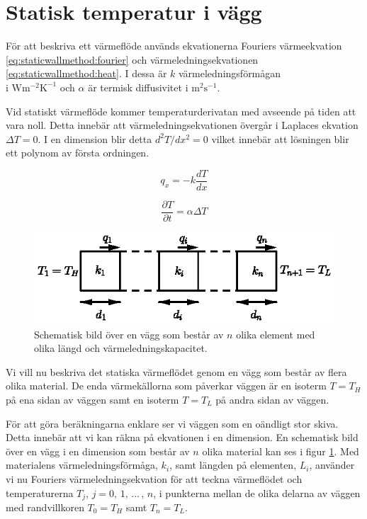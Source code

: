 \section{Statisk temperatur i vägg}

För att beskriva ett värmeflöde används ekvationerna Fouriers värmeekvation
\eqref{eq:staticwallmethod:fourier} och värmeledningsekvationen 
\eqref{eq:staticwallmethod:heat}. 
I dessa är
$k$ värmeledningsförmågan\\i $\mbox{W}\mbox{m}^{-2}\mbox{K}^{-1}$ och
$\alpha$ är termisk diffusivitet i $\mbox{m}^2\mbox{s}^{-1}$. \cite{physicshandbook}

Vid statiskt värmeflöde kommer temperaturderivatan med avseende på tiden att vara noll.
Detta innebär att värmeledningsekvationen övergår i Laplaces ekvation
$\Delta{}T = 0$. I en dimension blir detta $d^2T/dx^2 = 0$ vilket innebär
att lösningen blir ett polynom av första ordningen.  

\begin{equation}
\label{eq:staticwallmethod:fourier}
q_x = -k\frac{dT}{dx}
\end{equation}

\begin{equation}
\label{eq:staticwallmethod:heat}
\frac{\partial{}T}{\partial{}t} = \alpha\Delta{}T
\end{equation}

\begin{figure}
\centering
\includegraphics{images/wall.eps}
\caption{Schematisk bild över en vägg som består av $n$ olika element med olika
längd och värmeledningskapacitet.}\label{fig:staticwallmethod:wall}
\end{figure}

\noindent
Vi vill nu beskriva det statiska värmeflödet genom en vägg som består
av flera olika material. De enda värmekällorna som påverkar väggen
är en isoterm $T = T_H$ på ena sidan av väggen
samt en isoterm $T = T_L$ på andra sidan av väggen.

För att göra beräkningarna enklare
ser vi väggen som en oändligt stor skiva. Detta innebär att vi kan räkna
på ekvationen i en dimension. 
En schematisk bild över en vägg i en dimension som består av
$n$ olika material kan ses i figur \ref{fig:staticwallmethod:wall}.
Med materialens värmeledningsförmåga, $k_i$, samt längden
på elementen, $L_i$, använder vi nu Fouriers värmeledningsekvation för
att teckna värmeflödet och temperaturerna $T_j$,  $j=0,\,1,\,...\,,\,n$, i punkterna
mellan de olika delarna av väggen med randvillkoren $T_0 = T_H$ samt
$T_n = T_L$.

